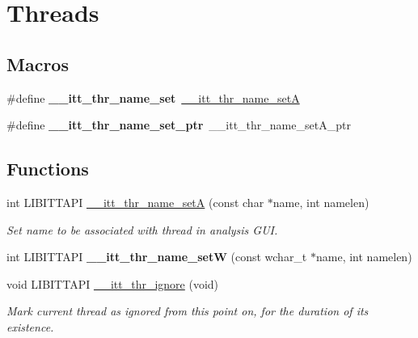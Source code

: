 \hypertarget{group__legacy__threads}{}\section{Threads}
\label{group__legacy__threads}
\subsection*{Macros}
\begin{DoxyCompactItemize}
\item 
\hypertarget{group__legacy__threads_ga01a4106860d96c6d77c31b3e35e7c5ac}{}\#define {\bfseries \+\_\+\+\_\+itt\+\_\+thr\+\_\+name\+\_\+set}~\hyperlink{group__legacy__threads_gabca4e69158b6ce29fcc0378616ac316a}{\+\_\+\+\_\+itt\+\_\+thr\+\_\+name\+\_\+set\+A}\label{group__legacy__threads_ga01a4106860d96c6d77c31b3e35e7c5ac}

\item 
\hypertarget{group__legacy__threads_gaa3690d1b081fe1b2e6b47778f51a2904}{}\#define {\bfseries \+\_\+\+\_\+itt\+\_\+thr\+\_\+name\+\_\+set\+\_\+ptr}~\+\_\+\+\_\+itt\+\_\+thr\+\_\+name\+\_\+set\+A\+\_\+ptr\label{group__legacy__threads_gaa3690d1b081fe1b2e6b47778f51a2904}

\end{DoxyCompactItemize}
\subsection*{Functions}
\begin{DoxyCompactItemize}
\item 
int L\+I\+B\+I\+T\+T\+A\+P\+I \hyperlink{group__legacy__threads_gabca4e69158b6ce29fcc0378616ac316a}{\+\_\+\+\_\+itt\+\_\+thr\+\_\+name\+\_\+set\+A} (const char $\ast$name, int namelen)
\begin{DoxyCompactList}\small\item\em Set name to be associated with thread in analysis G\+U\+I. \end{DoxyCompactList}\item 
\hypertarget{group__legacy__threads_ga6106bca8a2390f16d3c404f32fa5aa9d}{}int L\+I\+B\+I\+T\+T\+A\+P\+I {\bfseries \+\_\+\+\_\+itt\+\_\+thr\+\_\+name\+\_\+set\+W} (const wchar\+\_\+t $\ast$name, int namelen)\label{group__legacy__threads_ga6106bca8a2390f16d3c404f32fa5aa9d}

\item 
void L\+I\+B\+I\+T\+T\+A\+P\+I \hyperlink{group__legacy__threads_gae17553b2bca44e1d2e4696fc69a06abf}{\+\_\+\+\_\+itt\+\_\+thr\+\_\+ignore} (void)
\begin{DoxyCompactList}\small\item\em Mark current thread as ignored from this point on, for the duration of its existence. \end{DoxyCompactList}\end{DoxyCompactItemize}


